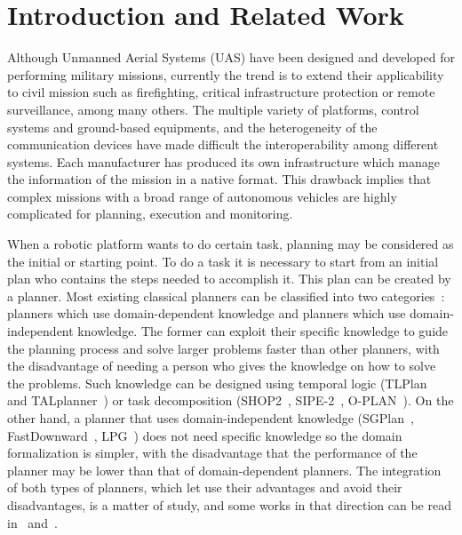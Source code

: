 \documentclass[twocolumn]{svjour3}          %
\begin{document}
\section{Introduction and Related Work}
\label{sec:intro}

Although Unmanned Aerial Systems (UAS) have been designed and developed for performing military missions, currently the trend is to extend
their applicability to civil mission such as firefighting, critical infrastructure protection or remote surveillance, among many others. 
The multiple variety of platforms, control systems and ground-based equipments, and the heterogeneity of the communication devices have made
difficult the interoperability among different systems. Each manufacturer has produced its own infrastructure which manage the
information of the mission in a native format. This drawback implies that complex missions with a broad range of autonomous vehicles are
highly complicated for planning, execution and monitoring. 

When a robotic platform wants to do certain task, planning may be considered as the initial or starting point. To do a task it is necessary to start from an initial plan who contains the steps needed to accomplish it. This plan can be created by a planner. Most existing classical planners can be classified into two categories~\cite{ingrand_ghallab_2013}: planners which use domain-dependent knowledge and planners which use domain-independent knowledge. The former can exploit their specific knowledge to guide the planning process and solve larger problems faster than other planners, with the disadvantage of needing a person who gives the knowledge on how to solve the problems. Such knowledge can be designed using temporal logic (TLPlan~\cite{Bacchus00usingtemporal} and TALplanner~\cite{Kvarnstrom01talplanner}) or task decomposition (SHOP2~\cite{Nau03shop2}, SIPE-2~\cite{Wilkins}, O-PLAN~\cite{Currie90}). On the other hand, a planner that uses domain-independent knowledge (SGPlan~\cite{Chen06}, FastDownward~\cite{Helmert06}, LPG~\cite{Gerevini01}) does not need specific knowledge so the domain formalization is simpler, with the disadvantage that the performance of the planner may be lower than that of domain-dependent planners. The integration of both types of planners, which let use their advantages and avoid their disadvantages, is a matter of study, and some works in that direction can be read in~\cite{Gerevini02} and~\cite{Shivashankar}.
\end{document}

